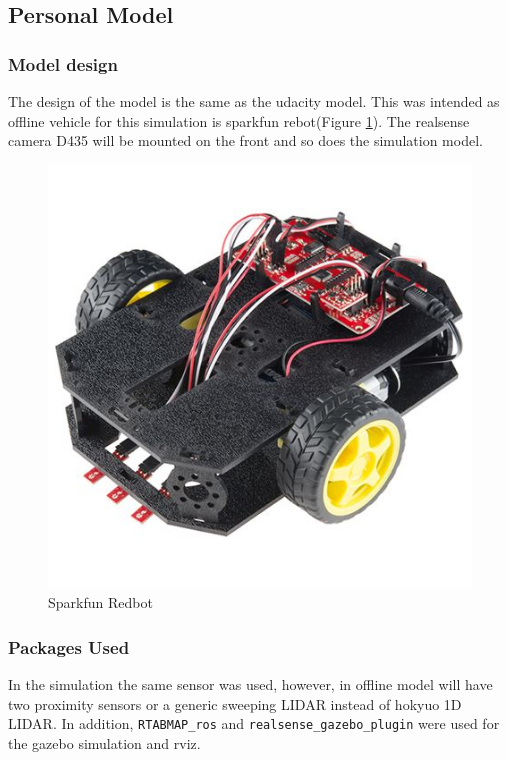 \documentclass[10pt,journal,compsoc]{IEEEtran}
\begin{document}
\subsection{Personal Model}
\subsubsection{Model design}
The design of the model is the same as the udacity model. This was intended as offline vehicle for this simulation is sparkfun rebot(Figure \ref{fig:sparkfunredbot}).
The realsense camera D435 will be mounted on the front and so does the simulation model.

\begin{figure}[thpb]
      \centering
      \includegraphics[width=\linewidth]{./img/sparkfunredbot.jpeg}
      \caption{Sparkfun Redbot}
      \label{fig:sparkfunredbot}
\end{figure}
\subsubsection{Packages Used}
In the simulation the same sensor was used, however, in offline model will have two proximity sensors or a generic sweeping LIDAR instead of hokyuo 1D LIDAR.
In addition, \verb!RTABMAP_ros! and \verb!realsense_gazebo_plugin! were used for the gazebo simulation and rviz.
\end{document}
